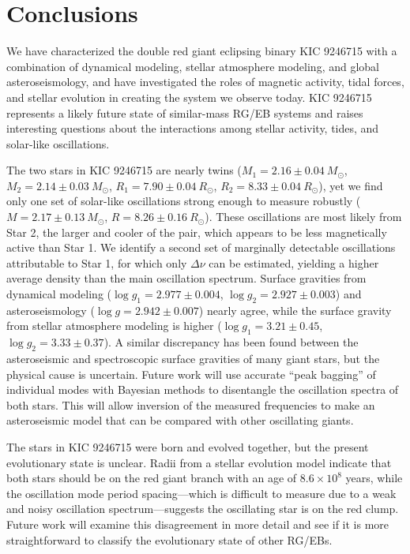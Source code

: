 \section{Conclusions}\label{conclude}

We have characterized the double red giant eclipsing binary KIC 9246715 with a combination of dynamical modeling, stellar atmosphere modeling, and global asteroseismology, and have investigated the roles of magnetic activity, tidal forces, and stellar evolution in creating the system we observe today. KIC 9246715 represents a likely future state of similar-mass RG/EB systems and raises interesting questions about the interactions among stellar activity, tides, and solar-like oscillations.

The two stars in KIC 9246715 are nearly twins ($M_1 = 2.16 \pm 0.04\ M_{\odot}$, $M_2 = 2.14 \pm 0.03\ M_{\odot}$, $R_1 = 7.90 \pm 0.04 \ R_{\odot}$, $R_2 = 8.33 \pm 0.04 \ R_{\odot}$), yet we find only one set of solar-like oscillations strong enough to measure robustly ($M = 2.17 \pm 0.13 \ M_{\odot}$, $R = 8.26 \pm 0.16 \ R_{\odot}$). These oscillations are most likely from Star 2, the larger and cooler of the pair, which appears to be less magnetically active than Star 1. We identify a second set of marginally detectable oscillations attributable to Star 1, for which only $\Delta \nu$ can be estimated, yielding a higher average density than the main oscillation spectrum. Surface gravities from dynamical modeling ($\log g_1 = 2.977 \pm 0.004$, $\log g_2 = 2.927 \pm 0.003$) and asteroseismology ($\log g = 2.942 \pm 0.007$) nearly agree, while the surface gravity from stellar atmosphere modeling is higher ($\log g_1 = 3.21 \pm 0.45$, $\log g_2 = 3.33 \pm 0.37$). A similar discrepancy has been found between the asteroseismic and spectroscopic surface gravities of many giant stars, but the physical cause is uncertain. Future work will use accurate ``peak bagging'' of individual modes with Bayesian methods to disentangle the oscillation spectra of both stars. This will allow inversion of the measured frequencies to make an asteroseismic model that can be compared with other oscillating giants.

The stars in KIC 9246715 were born and evolved together, but the present evolutionary state is unclear. Radii from a stellar evolution model indicate that both stars should be on the red giant branch with an age of $8.6 \times 10^8$ years, while the oscillation mode period spacing---which is difficult to measure due to a weak and noisy oscillation spectrum---suggests the oscillating star is on the red clump. Future work will examine this disagreement in more detail and see if it is more straightforward to classify the evolutionary state of other RG/EBs.

